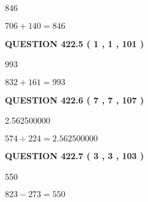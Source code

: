 \documentclass{ctexart}
\begin{document}
846
 
 
 
 
\noindent{}

$ %
706 +  %
140=   %
846$
 
 
  
\vspace{0.2in}
  
{\textbf{\Large{QUESTION
422.5 
 ( 1 , 1 , 101 )
}}}
  
  
 
 
\noindent{}

993
 
 
 
 
\noindent{}

$ %
832 +  %
161=   %
993$
 
 
  
\vspace{0.2in}
  
{\textbf{\Large{QUESTION
422.6 
 ( 7 , 7 , 107 )
}}}
  
  
 
 
\noindent{}

2.562500000
 
 
 
 
\noindent{}

$ %
574 \div  %
224=   %
2.562500000$
 
 
  
\vspace{0.2in}
  
{\textbf{\Large{QUESTION
422.7 
 ( 3 , 3 , 103 )
}}}
  
  
 
 
\noindent{}

550
 
 
 
 
\noindent{}

$ %
823 -  %
273=   %
550$
 
 
  
\vspace{0.2in}
  
\end{document}
